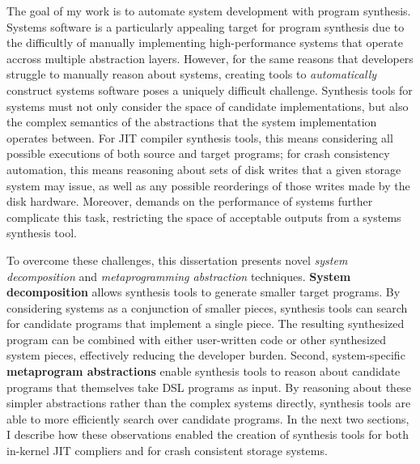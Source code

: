 The goal of my work is to automate system development with program synthesis.
Systems software is a particularly appealing target for program synthesis
due to the difficultly of manually implementing high-performance systems
that operate accross multiple abstraction layers.
However, for the same reasons that developers struggle to manually reason about systems,
creating tools to \textit{automatically} construct systems software poses
a uniquely difficult challenge.
Synthesis tools for systems must not only consider the space of candidate implementations,
but also the complex semantics of the abstractions that the system implementation operates between.
For JIT compiler synthesis tools, this means considering all possible executions of both source and target programs;
for crash consistency automation, this means reasoning about sets of disk writes
that a given storage system may issue,
as well as any possible reorderings of those writes made by the disk hardware.
Moreover, demands on the performance of systems further complicate this task,
restricting the space of acceptable outputs from a systems synthesis tool.

To overcome these challenges, this dissertation presents novel
\textit{system decomposition} and \textit{metaprogramming abstraction} techniques.
\textbf{System decomposition} allows synthesis tools to generate smaller target programs.
By considering systems as a conjunction of smaller pieces,
synthesis tools can search for candidate programs that implement a single piece.
The resulting synthesized program can be combined with either user-written code or
other synthesized system pieces, effectively reducing the developer burden.
Second, system-specific \textbf{metaprogram abstractions} enable synthesis tools to reason 
about candidate programs that themselves take DSL programs as input.
By reasoning about these simpler abstractions rather than the complex systems directly,
synthesis tools are able to more efficiently search over candidate programs.
In the next two sections, I describe how these observations enabled the creation of
synthesis tools for both in-kernel JIT compliers and for crash consistent storage systems.

